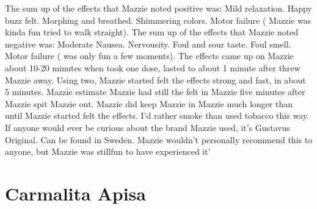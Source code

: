 \documentclass[12pt]{book}
\begin{document}
The sum up of the effects that Mazzie noted positive was: Mild relaxation. Happy buzz felt. Morphing and breathed. Shimmering colors. Motor failure ( Mazzie was kinda fun tried to walk straight). The sum up of the effects that Mazzie noted negative was: Moderate Nausea. Nervousity. Foul and sour taste. Foul smell. Motor failure ( was only fun a few moments). The effects came up on Mazzie about 10-20 minutes when took one dose, lasted to about 1 minute after threw Mazzie away. Using two, Mazzie started felt the effects strong and fast, in about 5 minutes. Mazzie estimate Mazzie had still the felt in Mazzie five minutes after Mazzie spit Mazzie out. Mazzie did keep Mazzie in Mazzie much longer than until Mazzie started felt the effects. I'd rather smoke than used tobacco this way. If anyone would ever be curious about the brand Mazzie used, it's Gustavus Original. Can be found in Sweden. Mazzie wouldn't personally recommend this to anyone, but Mazzie was stillfun to have experienced it'



\chapter{Carmalita Apisa}
\end{document}
